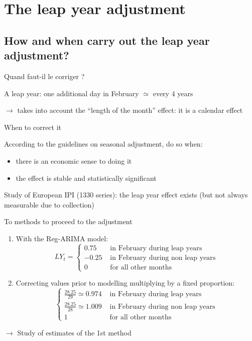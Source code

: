 \documentclass[10pt,xcolor=table,color={dvipsnames,usenames},ignorenonframetext,usepdftitle=false,french]{beamer}
\begin{document}
\section{The leap year adjustment}\label{the-leap-year-adjustment}

\subsection{How and when carry out the leap year
adjustment?}\label{how-and-when-carry-out-the-leap-year-adjustment}

\begin{frame}{Quand faut-il le corriger ?}

A leap year: one additional day in February \(\simeq\) every 4 years

\(\rightarrow\) takes into account the ``length of the month'' effect:
it is a calendar effect

\medskip

When to correct it \bcquestion 

\medskip \pause

According to the guidelines on seasonal adjustment, do so when:

\begin{itemize}
\item
  there is an economic sense to doing it
\item
  the effect is stable and statistically significant
\end{itemize}

\medskip \pause
Study of European IPI (1330 series): the leap year effect exists (but
not always measurable due to collection)

\end{frame}

\begin{frame}{To methods to proceed to the adjustment}

\begin{enumerate}
\item<1-> With the Reg-ARIMA model:
\[
LY_t = \begin{cases}
0.75 & \text{ in February during leap years} \\
-0.25  & \text{ in February during non leap years} \\
0 & \text{ for all other months}
\end{cases}
\]
\item<2-> Correcting values prior to modelling multiplying by a fixed proportion: 
\[\begin{cases}
\frac{28.25}{29} \simeq 0.974 & \text{ in February during leap years} \\
\frac{28.25}{28} \simeq 1.009 & \text{ in February during non leap years} \\
1 & \text{ for all other months}
\end{cases}
\]
\end{enumerate}

\pause[3]

\pause[4]

\(\rightarrow\) Study of estimates of the 1st method

\end{frame}
\end{document}
